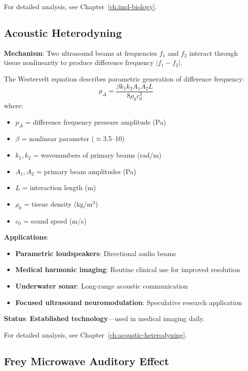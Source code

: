 For detailed analysis, see Chapter~\ref{ch:imd-biology}.

\subsection{Acoustic Heterodyning}

\textbf{Mechanism}: Two ultrasound beams at frequencies $f_1$ and $f_2$ interact through tissue nonlinearity to produce difference frequency $|f_1 - f_2|$.

The Westervelt equation describes parametric generation of difference frequency:
\begin{equation}
\label{eq:westervelt}
p_{\Delta} = \frac{\beta k_1 k_2 A_1 A_2 L}{8\rho_0 c_0^3}
\end{equation}
where:
\begin{itemize}
\item $p_{\Delta}$ = difference frequency pressure amplitude (Pa)
\item $\beta$ = nonlinear parameter ($\approx$3.5--10)
\item $k_1, k_2$ = wavenumbers of primary beams (rad/m)
\item $A_1, A_2$ = primary beam amplitudes (Pa)
\item $L$ = interaction length (m)
\item $\rho_0$ = tissue density (kg/m$^3$)
\item $c_0$ = sound speed (m/s)
\end{itemize}

\textbf{Applications}:
\begin{itemize}
\item \textbf{Parametric loudspeakers}: Directional audio beams
\item \textbf{Medical harmonic imaging}: Routine clinical use for improved resolution
\item \textbf{Underwater sonar}: Long-range acoustic communication
\item \textbf{Focused ultrasound neuromodulation}: Speculative research application
\end{itemize}

\textbf{Status}: \textbf{Established technology}---used in medical imaging daily.

For detailed analysis, see Chapter~\ref{ch:acoustic-heterodyning}.

\subsection{Frey Microwave Auditory Effect}

